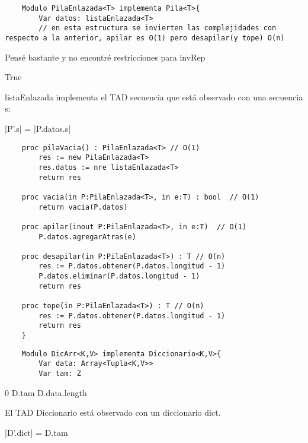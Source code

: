 \documentclass[10pt,a4paper]{article}
\begin{document}
\begin{lstlisting}
	Modulo PilaEnlazada<T> implementa Pila<T>{
		Var datos: listaEnlazada<T>
		// en esta estructura se invierten las complejidades con respecto a la anterior, apilar es O(1) pero desapilar(y tope) O(n)
\end{lstlisting}

Pensé bastante y no encontré restricciones para invRep

{True}

listaEnlazada implementa el TAD secuencia que está observado con una secuencia s:

{|P'.s| = |P.datos.s| \land \\
}

\begin{lstlisting}
	proc pilaVacia() : PilaEnlazada<T> // O(1)
		res := new PilaEnlazada<T>
		res.datos := nre listaEnlazada<T>
		return res

	proc vacia(in P:PilaEnlazada<T>, in e:T) : bool  // O(1)
		return vacia(P.datos)

	proc apilar(inout P:PilaEnlazada<T>, in e:T)  // O(1)
		P.datos.agregarAtras(e)

	proc desapilar(in P:PilaEnlazada<T>) : T // O(n)
		res := P.datos.obtener(P.datos.longitud - 1)
		P.datos.eliminar(P.datos.longitud - 1)
		return res

	proc tope(in P:PilaEnlazada<T>) : T // O(n)
		res := P.datos.obtener(P.datos.longitud - 1)
		return res
	}
\end{lstlisting}

\begin{lstlisting}
	Modulo DicArr<K,V> implementa Diccionario<K,V>{
		Var data: Array<Tupla<K,V>>
		Var tam: Z
\end{lstlisting}

{0 \le D.tam \le D.data.length \land \\
}

El TAD Diccionario está observado con un diccionario dict.

{|D'.dict| = D.tam \land \\
}
\end{document}
